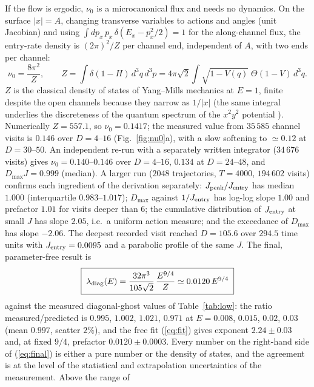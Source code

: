 \documentclass[11pt,a4paper]{article}
\begin{document}
If the flow is ergodic, $\nu_0$ is a microcanonical flux and needs no dynamics. On the surface
$|x|=A$, changing transverse variables to actions and angles (unit Jacobian) and using
$\int dp_x\,p_x\,\delta(E_x-p_x^2/2)=1$ for the along-channel flux, the entry-rate density is
$(2\pi)^2/Z$ per channel end, independent of $A$, with two ends per channel:
\begin{equation}
\nu_0=\frac{8\pi^2}{Z},\qquad Z=\int\delta(1-H)\,d^3q\,d^3p
=4\pi\sqrt2\int\sqrt{1-V(q)}\;\Theta(1-V)\,d^3q .
\end{equation}
$Z$ is the classical density of states of Yang--Mills mechanics at $E=1$, finite despite the open
channels because they narrow as $1/|x|$ (the same integral underlies the discreteness of the
quantum spectrum of the $x^2y^2$ potential \cite{Simon83}). Numerically $Z=557.1$, so
$\nu_0=0.1417$; the measured value from $35\,585$ channel visits is $0.146$ over $D=4$--$16$
(Fig.~\ref{fig:nu0}a), with a slow softening to $\simeq0.12$ at $D=30$--$50$. An independent
re-run with a separately written integrator ($34\,676$ visits) gives $\nu_0=0.140$--$0.146$ over
$D=4$--$16$, $0.134$ at $D=24$--$48$, and $D_{\max}J=0.999$ (median). A larger run
($2048$ trajectories, $T=4000$, $194\,602$ visits) confirms each ingredient of the derivation
separately: $J_{\rm peak}/J_{\rm entry}$ has median $1.000$ (interquartile $0.983$--$1.017$);
$D_{\max}$ against $1/J_{\rm entry}$ has log-log slope $1.00$ and prefactor $1.01$ for visits
deeper than $6$; the cumulative distribution of $J_{\rm entry}$ at small $J$ has slope $2.05$,
i.e.\ a uniform action measure; and the exceedance of $D_{\max}$ has slope $-2.06$. The
deepest recorded visit reached $D=105.6$ over $294.5$ time units with $J_{\rm entry}=0.0095$
and a parabolic profile of the same $J$. The final,
parameter-free result is
\begin{equation}
\boxed{\;\lambda_{\rm diag}(E)=\frac{32\pi^3}{105\sqrt2}\,\frac{E^{9/4}}{Z}\simeq0.0120\,E^{9/4}\;}
\label{eq:final}
\end{equation}
against the measured diagonal-ghost values of Table~\ref{tab:low}: the ratio
measured/predicted is $0.995$, $1.002$, $1.021$, $0.971$ at $E=0.008$, $0.015$, $0.02$, $0.03$
(mean $0.997$, scatter $2\%$), and the free fit (\ref{eq:fit}) gives exponent $2.24\pm0.03$ and,
at fixed $9/4$, prefactor $0.0120\pm0.0003$. Every number on the right-hand side of
(\ref{eq:final}) is either a pure number or the density of states, and the agreement is at the
level of the statistical and extrapolation uncertainties of the measurement. Above the range of
\end{document}
